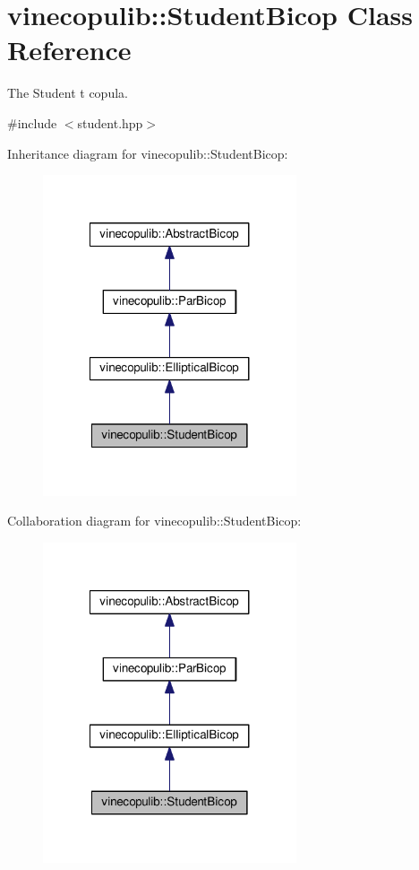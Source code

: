 \hypertarget{classvinecopulib_1_1_student_bicop}{\section{vinecopulib\+:\+:Student\+Bicop Class Reference}
\label{classvinecopulib_1_1_student_bicop}
}


The Student t copula.  




{\ttfamily \#include $<$student.\+hpp$>$}



Inheritance diagram for vinecopulib\+:\+:Student\+Bicop\+:\nopagebreak
\begin{figure}[H]
\begin{center}
\leavevmode
\includegraphics[width=212pt]{classvinecopulib_1_1_student_bicop__inherit__graph}
\end{center}
\end{figure}


Collaboration diagram for vinecopulib\+:\+:Student\+Bicop\+:\nopagebreak
\begin{figure}[H]
\begin{center}
\leavevmode
\includegraphics[width=212pt]{classvinecopulib_1_1_student_bicop__coll__graph}
\end{center}
\end{figure}
